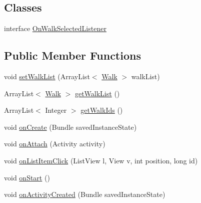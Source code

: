 \subsection*{Classes}
\begin{DoxyCompactItemize}
\item 
interface \hyperlink{interfaceuk_1_1ac_1_1swan_1_1digitaltrails_1_1fragments_1_1_walk_list_fragment_1_1_on_walk_selected_listener}{On\+Walk\+Selected\+Listener}
\end{DoxyCompactItemize}
\subsection*{Public Member Functions}
\begin{DoxyCompactItemize}
\item 
void \hyperlink{classuk_1_1ac_1_1swan_1_1digitaltrails_1_1fragments_1_1_walk_list_fragment_ad968cb36880ab53cdc99e690e09fc210}{set\+Walk\+List} (Array\+List$<$ \hyperlink{classuk_1_1ac_1_1swan_1_1digitaltrails_1_1components_1_1_walk}{Walk} $>$ walk\+List)
\item 
Array\+List$<$ \hyperlink{classuk_1_1ac_1_1swan_1_1digitaltrails_1_1components_1_1_walk}{Walk} $>$ \hyperlink{classuk_1_1ac_1_1swan_1_1digitaltrails_1_1fragments_1_1_walk_list_fragment_a88578ad55fa181c8d5af67f6a3edbb51}{get\+Walk\+List} ()
\item 
Array\+List$<$ Integer $>$ \hyperlink{classuk_1_1ac_1_1swan_1_1digitaltrails_1_1fragments_1_1_walk_list_fragment_ac3d1ef9d20e7e3c500e5acc5036b49d6}{get\+Walk\+Ids} ()
\item 
void \hyperlink{classuk_1_1ac_1_1swan_1_1digitaltrails_1_1fragments_1_1_walk_list_fragment_ae4b19c342bd6ba019426211406fca34d}{on\+Create} (Bundle saved\+Instance\+State)
\item 
void \hyperlink{classuk_1_1ac_1_1swan_1_1digitaltrails_1_1fragments_1_1_walk_list_fragment_aa4cfeab8620bfaeea0b9ef5937051299}{on\+Attach} (Activity activity)
\item 
void \hyperlink{classuk_1_1ac_1_1swan_1_1digitaltrails_1_1fragments_1_1_walk_list_fragment_a291d074057c67d05c205ca289e8e94b6}{on\+List\+Item\+Click} (List\+View l, View v, int position, long id)
\item 
void \hyperlink{classuk_1_1ac_1_1swan_1_1digitaltrails_1_1fragments_1_1_walk_list_fragment_ad30ec8ae4f8d54e6a8095fff4db011b1}{on\+Start} ()
\item 
void \hyperlink{classuk_1_1ac_1_1swan_1_1digitaltrails_1_1fragments_1_1_walk_list_fragment_acbecded42ffc4c86d8703c7d21f8b5ef}{on\+Activity\+Created} (Bundle saved\+Instance\+State)

\end{DoxyCompactItemize}
